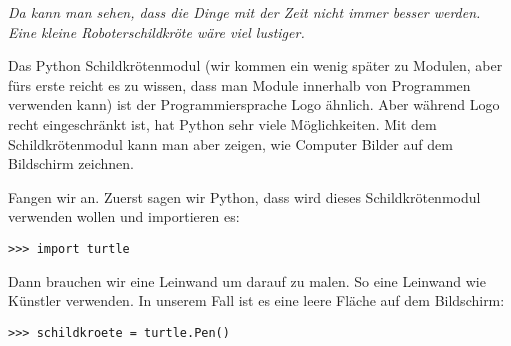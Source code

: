 \emph{Da kann man sehen, dass die Dinge mit der Zeit nicht immer besser werden. Eine kleine Roboterschildkröte wäre viel lustiger.}

Das Python Schildkrötenmodul (wir kommen ein wenig später zu Modulen, aber fürs erste reicht es zu wissen, dass man Module innerhalb von Programmen verwenden kann) ist der Programmiersprache Logo ähnlich. Aber während Logo recht eingeschränkt ist, hat Python sehr viele Möglichkeiten. Mit dem Schildkrötenmodul kann man aber zeigen, wie Computer Bilder auf dem Bildschirm zeichnen.

Fangen wir an. Zuerst sagen wir Python, dass wird dieses Schildkrötenmodul verwenden wollen und importieren es:


\begin{Verbatim}[frame=single]
>>> import turtle
\end{Verbatim}

Dann brauchen wir eine Leinwand um darauf zu malen. So eine Leinwand wie Künstler verwenden. In unserem Fall ist es eine leere Fläche auf dem Bildschirm:

\begin{Verbatim}[frame=single]
>>> schildkroete = turtle.Pen()
\end{Verbatim}


